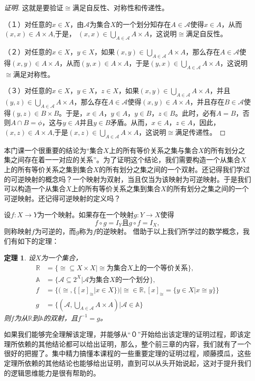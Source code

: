 \documentclass{book}[oneside]
\newtheorem{Thm}{定理}[chapter]
\begin{document}
\begin{CJK*}{UTF8}{gbsn}
  \begin{proof}[证明]
    这就是要验证$\cong$满足自反性、对称性和传递性。

    （１）对任意的$x\in X$，由$\mathscr{A}$为集合$X$的一个划分知存在$A\in \mathscr{A}$使得$x\in A$，从而$(x,x) \in A\times A$,于是， $(x,x)\in \bigcup_{A\in \mathscr{A}}A\times A$，这说明$\cong$满足自反性。

    （２）对任意的$x\in X$，$y\in X$，如果$(x,y)\in \bigcup_{A\in \mathscr{A}}A\times A$，那么存在$A\in \mathscr{A}$使得$(x,y)\in A\times A$，从而$(y,x)\in A\times A$，于是$(y,x)\in \bigcup_{A\in \mathscr{A}}A\times A$，这说明$\cong$满足对称性。

    （３）对任意的$x\in X$，$y\in X$，$z\in X$，如果$(x,y)\in \bigcup_{A\in \mathscr{A}}A\times A$，并且$(y,z)\in \bigcup_{A\in \mathscr{A}}A\times A$，那么存在$A\in \mathscr{A}$使得$(x,y)\in A\times A$，并且存在$B\in \mathscr{A}$使得$(y,z)\in B\times B$。于是，$x\in A$，$y\in A$，$y\in B$，$z\in B$。此时，必有$A=B$，否则$A\cap B=\phi$，这与$y\in A$并且$y\in B$矛盾。从而，$x\in A$，$z\in A$，因此，$(x,z)\in A\times A$,于是$(x,z)\in \bigcup_{A\in \mathscr{A}}A\times A$，这说明$\cong$满足传递性。
    
  \end{proof}

  本门课一个很重要的结论为“集合$X$上的所有等价关系之集与集合$X$的所有划分之集之间存在着一一对应的关系”。为了证明这个结论，我们需要构造一个从集合$X$上的所有等价关系之集到集合$X$的所有划分之集之间的一个双射。还记得我们学过的可逆映射的概念吗？一个映射为双射，当且仅当为该映射为可逆映射。于是我们可以构造一个从集合$X$上的所有等价关系之集到集合$X$的所有划分之集之间的一个可逆映射。还记得可逆映射的定义吗？

       设$f:X\to Y$为一个映射。如果存在一个映射$g:Y\to X$使得\[f\circ g = I_{Y} \text{且} g\circ f = I_{X},\]则称映射$f$为可逆的，而$g$称为$f$的逆映射。
借助于以上我们所学过的数学概念，我们有如下的定理：
 \begin{Thm}
    设$X$为一个集合，
    \begin{align*}
    \mathbb{R} &= \{\cong \subseteq X \times X | \cong\text{为集合}X\text{上的一个等价关系}\},\\
      \mathbb{A} &= \{\mathscr{A} \subseteq 2^X| \mathscr{A}\text{为集合}X\text{的一个划分}\},\\
      f &= \{(\cong, \{[x]_{\cong} | x \in X\})|\cong \in \mathbb{R}, [x]_{\cong}=\{y\in X | x \cong y\}\}\\
      g&=\{(\mathscr{A}, \bigcup_{A \in \mathscr{A}}A\times A)|\mathscr{A} \in \mathbb{A}\}
    \end{align*}
    则$f$为从$\mathbb{R}$到$\mathbb{A}$的双射，且$f^{-1}=g$。
  \end{Thm}
  如果我们能够完全理解该定理，并能够从“０”开始给出该定理的证明过程，即该定理所依赖的其他结论都可以给出证明，那么，整个前三章的内容，我们就有了一个很好的把握了。集中精力搞懂本课程的一些重要定理的证明过程，顺藤摸瓜，这些定理所依赖的其他结论也能够给出证明，直到可以从头开始说起，这对于提升我们的逻辑思维能力是很有帮助的。


\end{CJK*}
\end{document}

